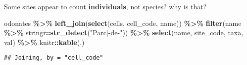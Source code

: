 \documentclass[
]{book}
\newenvironment{Shaded}{\begin{snugshade}}{\end{snugshade}}
\newcommand{\KeywordTok}[1]{\textcolor[rgb]{0.13,0.29,0.53}{\textbf{#1}}}
\newcommand{\NormalTok}[1]{#1}
\newcommand{\OperatorTok}[1]{\textcolor[rgb]{0.81,0.36,0.00}{\textbf{#1}}}
\newcommand{\StringTok}[1]{\textcolor[rgb]{0.31,0.60,0.02}{#1}}
\begin{document}
Some sites appear to count \textbf{individuals}, not species? why is that?

\begin{Shaded}
\begin{Highlighting}[]
\NormalTok{odonates }\OperatorTok{\%\textgreater{}\%}\StringTok{ }
\StringTok{  }\KeywordTok{left\_join}\NormalTok{(}\KeywordTok{select}\NormalTok{(cells, cell\_code, name)) }\OperatorTok{\%\textgreater{}\%}\StringTok{ }
\StringTok{  }\KeywordTok{filter}\NormalTok{(name }\OperatorTok{\%\textgreater{}\%}\StringTok{ }\NormalTok{stringr}\OperatorTok{::}\KeywordTok{str\_detect}\NormalTok{(}\StringTok{"Parc|{-}de{-}"}\NormalTok{)) }\OperatorTok{\%\textgreater{}\%}\StringTok{ }
\StringTok{  }\KeywordTok{select}\NormalTok{(name, site\_code, taxa, val) }\OperatorTok{\%\textgreater{}\%}\StringTok{ }\NormalTok{knitr}\OperatorTok{::}\KeywordTok{kable}\NormalTok{(.)}
\end{Highlighting}
\end{Shaded}

\begin{verbatim}
## Joining, by = "cell_code"
\end{verbatim}
\end{document}
